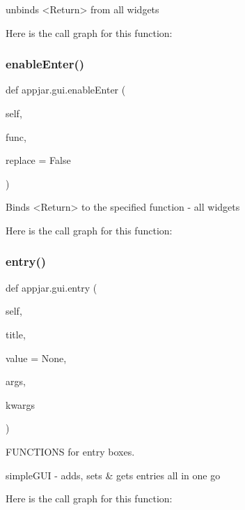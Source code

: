 \begin{DoxyVerb}unbinds <Return> from all widgets \end{DoxyVerb}
 Here is the call graph for this function\+:
\mbox{\label{classappjar_1_1gui_a06b1b40481bbc944960237fff978e071}} 
\subsubsection{\texorpdfstring{enable\+Enter()}{enableEnter()}}
{\footnotesize\ttfamily def appjar.\+gui.\+enable\+Enter (\begin{DoxyParamCaption}\item[{}]{self,  }\item[{}]{func,  }\item[{}]{replace = {\ttfamily False} }\end{DoxyParamCaption})}

\begin{DoxyVerb}Binds <Return> to the specified function - all widgets \end{DoxyVerb}
 Here is the call graph for this function\+:
\mbox{\label{classappjar_1_1gui_af671c577cd0dd722c41481db20ff80f5}} 
\subsubsection{\texorpdfstring{entry()}{entry()}}
{\footnotesize\ttfamily def appjar.\+gui.\+entry (\begin{DoxyParamCaption}\item[{}]{self,  }\item[{}]{title,  }\item[{}]{value = {\ttfamily None},  }\item[{}]{args,  }\item[{}]{kwargs }\end{DoxyParamCaption})}



F\+U\+N\+C\+T\+I\+O\+NS for entry boxes. 

\begin{DoxyVerb}simpleGUI - adds, sets & gets entries all in one go \end{DoxyVerb}
 Here is the call graph for this function\+:
\mbox{\label{classappjar_1_1gui_ac310868eecf500d1570400b396793b87}} 
